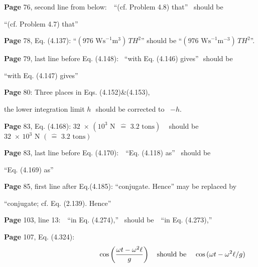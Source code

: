 \documentclass[a4paper,12pt]{article}
\begin{document}
\noindent %
{\bf Page} 76,  second line from below: \,\,  ``(cf. Problem 4.8) that''\,\,\, should be \,\, 

``(cf. Problem 4.7) that'' %
\vspace{0.2cm}

\noindent %
{\bf Page} 78, Eq. (4.137):    
``$(976 \mbox{ Ws}^{-1}\mbox{m}^{3})\,TH^{2}$'' should be ``$(976 \mbox{ Ws}^{-1}\mbox{m}^{-3})\,TH^{2}$''.   %
\vspace{0.2cm}

\noindent %
{\bf Page} 79,  last line before Eq. (4.148): \,  ``with Eq. (4.146) gives''\,\ should be \,\ 

``with Eq. (4.147) gives'' %
\vspace{0.2cm}

\noindent %
{\bf Page} 80: Three places in Eqs. (4.152)\&(4.153), \,\, 

the lower integration limit $h$\,\, should be corrected to \, $-h$. %
\vspace{0.2cm}

\noindent %
{\bf Page} 83, Eq. (4.168):  $32\,\,\!\times\,\!(10^{3} \mbox{ N } \,\widehat{=}\mbox{ 3.2 tons})$ \,\,\ 
should be \,\, $32\,\,\!\times\,\!10^{3} \mbox{ N } (\,\widehat{=}\mbox{ 3.2 tons})$ %
\vspace{0.2cm}

\noindent %
{\bf Page} 83,  last line before Eq. (4.170): \,\,  ``Eq. (4.118) as''\,\,\, should be \,\, 

``Eq. (4.169) as'' %
\vspace{0.2cm}

\noindent %
{\bf Page} 85,  first line after Eq.(4.185):   ``conjugate. Hence'' may be replaced by

``conjugate; cf. Eq. (2.139). Hence'' %
\vspace{0.2cm}

\noindent %
{\bf Page} 103, line 13: \,\,  ``in Eq. (4.274),''\,\,\, should be \,\, ``in Eq. (4.273),''
\vspace{0.5cm}

\noindent %
{\bf Page} 107, Eq. (4.324): 
\vspace{-1.2cm}                 
\begin{equation*} \hspace{4.2cm} 
          \cos \left(\frac{\omega t - \omega^{2}\ell}{g}\right)  \,\,\,\,\,\, \mbox{should be} \,\,\,\,\,\,\, 
          \cos \, (\omega t - \omega^{2}\ell/g)            \end{equation*} %
\vspace{0.2cm}
\vspace{-0.6cm}
%
\vspace{0.1cm}
\end{document}
